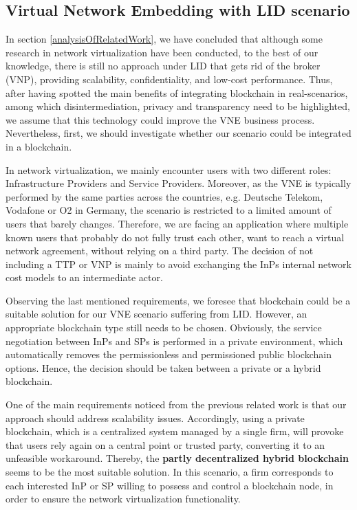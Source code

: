 \subsection{Virtual Network Embedding with LID scenario}

In section \ref{analysisOfRelatedWork}, we have concluded that although some research in network virtualization have been conducted, to the best of our knowledge, there is still no approach under LID that gets rid of the broker (VNP), providing scalability, confidentiality, and low-cost performance. Thus, after having spotted the main benefits of integrating blockchain in real-scenarios, among which disintermediation, privacy  and transparency need to be highlighted, we assume that this technology could improve the VNE business process. Nevertheless, first, we should investigate whether our scenario could be integrated in a blockchain.

In network virtualization, we mainly encounter users with two different roles: Infrastructure Providers and Service Providers. Moreover, as the VNE is typically performed by the same parties across the countries, e.g. Deutsche Telekom, Vodafone or O2 in Germany, the scenario is restricted to a limited amount of users that barely changes. Therefore, we are facing an application where multiple known users that probably do not fully trust each other, want to reach a virtual network agreement, without relying on a third party. The decision of not including a TTP or VNP is mainly to avoid exchanging the InPs internal network cost models to an intermediate actor.

Observing the last mentioned requirements, we foresee that blockchain could be a suitable solution for our VNE scenario suffering from LID. However, an appropriate blockchain type still needs to be chosen. Obviously, the service negotiation between InPs and SPs is performed in a private environment, which automatically removes the permissionless and permissioned public blockchain options. Hence, the decision should be taken between a private or a hybrid blockchain.

One of the main requirements noticed from the previous related work is that our approach should address scalability issues. Accordingly, using a private blockchain, which is a centralized system managed by a single firm, will provoke that users rely again on a central point or trusted party, converting it to an unfeasible workaround. Thereby, the \textbf{partly decentralized hybrid blockchain} seems to be the most suitable solution. In this scenario, a firm corresponds to each interested InP or SP willing to possess and control a blockchain node, in order to ensure the network virtualization functionality.


